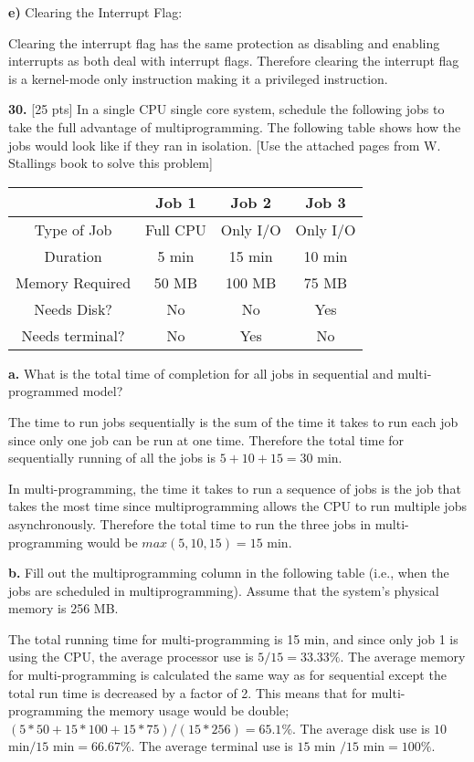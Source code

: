 \documentclass[12pt]{article}
\begin{document}
{\bf e)} Clearing the Interrupt Flag:

Clearing the interrupt flag has the same protection as disabling and enabling interrupts as both deal with interrupt flags. Therefore clearing the interrupt flag is a kernel-mode only instruction making it a privileged instruction. 

\bigskip

{\bf 30.} [25 pts] In a single CPU single core system, schedule the following jobs to take the full advantage of multiprogramming. The following table shows how the jobs would look like if they ran in isolation. [Use the attached pages from W. Stallings book to solve this problem]

\begin{center}
\begin{tabular}{| c || c | c | c |}
\hline
& Job 1 & Job 2 & Job 3\\
\hline\hline
Type of Job & Full CPU & Only I/O & Only I/O\\
\hline
Duration & 5 min & 15 min & 10 min\\
\hline
Memory Required & 50 MB & 100 MB & 75 MB\\
\hline
Needs Disk? & No & No & Yes\\
\hline
Needs terminal? & No & Yes & No\\
\hline
\end{tabular}
\end{center}

{\bf a.} What is the total time of completion for all jobs in sequential and multi-programmed model? 

The time to run jobs sequentially is the sum of the time it takes to run each job since only one job can be run at one time. Therefore the total time for sequentially running of all the jobs is $5+10+15=30$ min. 

In multi-programming, the time it takes to run a sequence of jobs is the job that takes the most time since multiprogramming allows the CPU to run multiple jobs asynchronously. Therefore the total time to run the three jobs in multi-programming would be $max(5,10,15)=15$ min. 

{\bf b.} Fill out the multiprogramming column in the following table (i.e., when the jobs are scheduled in multiprogramming). Assume that the system's physical memory is 256 MB.

The total running time for multi-programming is 15 min, and since only job 1 is using the CPU, the average processor use is $5/15=33.33\%$. The average memory for multi-programming is calculated the same way as for sequential except the total run time is decreased by a factor of 2. This means that for multi-programming the memory usage would be double; $(5*50+15*100+15*75)/(15*256)=65.1\%$. The average disk use is $10$ min$/15$ min$=66.67\%$. The average terminal use is $15$ min $/15$ min$=100\%$. 
\end{document}
